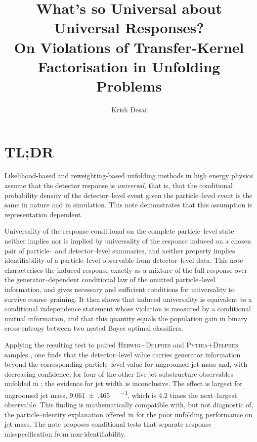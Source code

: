 \documentclass[12pt]{article}
\title{What's so Universal about Universal Responses?\\[0.5em]
       \large On Violations of Transfer-Kernel Factorisation in Unfolding Problems}
\author{Krish Desai}
\newcommand{\1}{\mathbbm{1}}
\renewcommand{\[}{\begin{equation}}
\renewcommand{\]}{\end{equation}}
\begin{document}
\maketitle

\section*{TL;DR}
    Likelihood-based and reweighting-based unfolding methods in high energy physics assume that the detector response is \emph{universal}, that is, that the conditional probability density of the detector--level event given the particle--level event is the same in nature and in simulation.
    This note demonstrates that this assumption is representation dependent.
    
    Universality of the response conditional on the complete particle--level state neither implies nor is implied by universality of the response induced on a chosen pair of particle-- and detector--level summaries, and neither property implies identifiability of a particle--level observable from detector--level data.
    This note characterises the induced response exactly as a mixture of the full response over the generator--dependent conditional law of the omitted particle--level information, and gives necessary and sufficient conditions for universality to survive coarse--graining.
    It then shows that induced universality is equivalent to a conditional independence statement whose violation is measured by a conditional mutual information, and that this quantity equals the population gain in binary cross-entropy between two nested Bayes optimal classifiers.
    
    Applying the resulting test to paired \textsc{Herwig}+\textsc{Delphes} and \textsc{Pythia}+\textsc{Delphes} samples \cite{andreassen_2019_3548091}, one finds that the detector--level value carries generator information beyond the corresponding particle--level value for ungroomed jet mass and, with decreasing confidence, for four of the other five jet substructure observables unfolded in \textcite{Andreassen:2019cjw}; the evidence for jet width is inconclusive.
    The effect is largest for ungroomed jet mass, \qty{9.061(465)}{\milli\nat\per\event}, which is \num{4.2} times the next--largest observable.
    This finding is mathematically compatible with, but not diagnostic of, the particle--identity explanation offered in \textcite{Andreassen:2019cjw} for the poor unfolding performance on jet mass. The note proposes conditional tests that separate response misspecification from non-identifiability.
    
\end{document}
